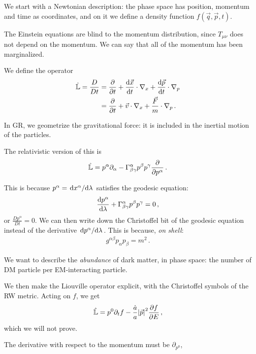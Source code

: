 \documentclass[main.tex]{subfiles}
\begin{document}
We start with a Newtonian description: the phase space has position, momentum and time as coordinates, and on it we define a density function \(f(\vec{q}, \vec{p}, t)\). 

The Einstein equations are blind to the momentum distribution, since \(T_{\mu \nu }\) does not depend on the momentum. We can say that all of the momentum has been marginalized. 

We define the operator 
%
\begin{align}
  \hat{\mathbb{L}} = \frac{D}{Dt} &= \pdv{}{t} + \dv{\vec{x}}{t} \cdot \nabla_x + \dv{\vec{p}}{t} \cdot \nabla_p   \\
  &= \pdv{}{t} + \vec{v} \cdot \nabla_x + \frac{\vec{F}}{m} \cdot \nabla_p 
\,. 
\end{align}

In GR, we geometrize the gravitational force: it is included in the inertial motion of the particles. 

The relativistic version of this is 
%
\begin{align}
  \hat{\mathbb{L}} = p^{\alpha } \partial_{\alpha } - \Gamma^{\alpha }_{\beta \gamma } p^{\beta } p^{\gamma } \pdv{}{p^{\alpha }}
\,.
\end{align}
%

This is because \(p^{\alpha } = \dv*{x^{\alpha }}{\lambda }\) satisfies the geodesic equation: 
%
\begin{align}
  \dv{p^{\alpha }}{\lambda } + \Gamma^{\alpha }_{\beta \gamma } p^{\beta } p^{\gamma }=0
\,,
\end{align}
%
or \(\frac{Dp^{\alpha }}{Dt } =0\). We can then write down the Christoffel bit of the geodesic equation instead of the derivative \(\dv*{p^{\alpha }}{\lambda }\). This is because, \emph{on shell}: 
%
\begin{align}
  g^{\alpha \beta } p_{\alpha } p_{\beta } = m^2
\,. 
\end{align}

We want to describe the \emph{abundance} of dark matter, in phase space: the number of DM particle per EM-interacting particle. 

We then make the Liouville operator explicit, with the Christoffel symbols of the RW metric. Acting on \(f\), we get 
%
\begin{align}
  \hat{\mathbb{L}}  = p^{0} \partial_t f - \frac{\dot{a}}{a} \abs{\vec{p}}^2 \pdv{f}{E}
\,,
\end{align}
%
which we will not prove. 

The derivative with respect to the momentum must be \(\partial_{p^{0}}\),
\end{document}
